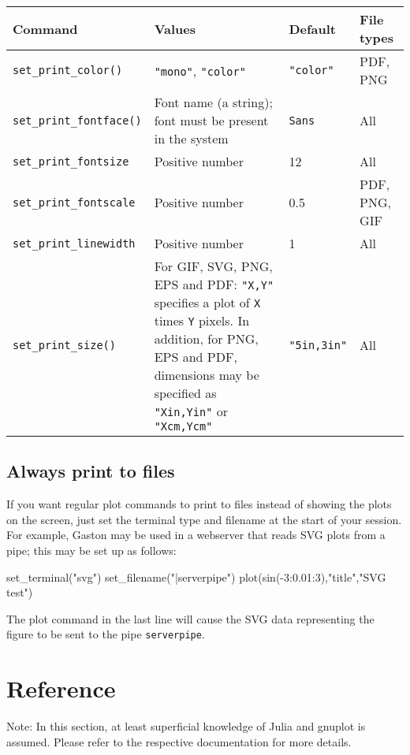 \documentclass[11pt]{article}
\newcommand{\cmd}[1]{\texttt{#1}}
\begin{document}
\begin{center}
\begin{tabular}{lp{4cm}ll}
	\toprule
	\textbf{Command} & \textbf{Values} & \textbf{Default} & \textbf{File types}
	\\
	\midrule
	\cmd{set\_print\_color()} & \cmd{"mono"}, \cmd{"color"} & \cmd{"color"} &
	PDF, PNG \\
	\cmd{set\_print\_fontface()} & Font name (a string); font must be present
	in the system & \cmd{Sans} & All \\
	\cmd{set\_print\_fontsize} & Positive number & 12 & All \\
	\cmd{set\_print\_fontscale} & Positive number & 0.5 & PDF, PNG, GIF \\
	\cmd{set\_print\_linewidth} & Positive number & 1 & All \\
	\cmd{set\_print\_size()} & For GIF, SVG, PNG, EPS and PDF: \cmd{"X,Y"}
	specifies a plot of
	\cmd{X} times \cmd{Y} pixels. In addition, for PNG, EPS and PDF, dimensions
	may be specified as \cmd{"Xin,Yin"} or \cmd{"Xcm,Ycm"} & \cmd{"5in,3in"} &
	All \\
	\bottomrule
\end{tabular}
\end{center}

\subsection{Always print to files}

If you want regular plot commands to print to files instead of showing the
plots on the screen, just set the terminal type and filename at the start of
your session. For example, Gaston may be used in a webserver that reads SVG
plots from a pipe; this may be set up as follows:
\begin{juliacode}
set_terminal("svg")
set_filename("|serverpipe")
plot(sin(-3:0.01:3),"title","SVG test")
\end{juliacode}
The plot command in the last line will cause the SVG data representing the
figure to be sent to the pipe \cmd{serverpipe}.

\section{Reference}
\label{refer}

Note: In this section, at least superficial knowledge of Julia and gnuplot is
assumed. Please refer to the respective documentation for more details.
\end{document}
